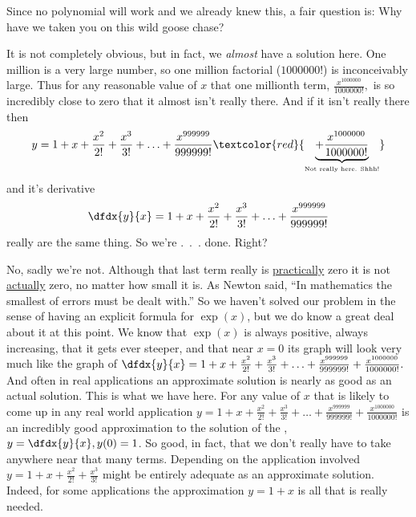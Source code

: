 Since no polynomial will work and we already knew this, a fair
question is: Why have we taken you on this wild goose chase?

It is not completely obvious, but in fact, we \emph{almost}
have a solution here. One million is a very large number, so one
million factorial ($1000000!$) is inconceivably large. Thus for any
reasonable value of $x$ that one millionth term,
$\frac{x^{1000000}}{1000000!},$ is so incredibly close to zero that it
almost isn't really there. And if it isn't really there then
$$
y= 1+x+\frac{x^2}{2!}+\frac{x^3}{3!} + \ldots +
\frac{x^{999999}}{999999!} 
\textcolor{red}{\underbrace{+
    \frac{x^{1000000}}{1000000!}}_{\text{\tiny Not really
      here. Shhh!}}}
$$
and it's derivative
$$
\dfdx{y}{x}= 1+x+\frac{x^2}{2!}+\frac{x^3}{3!} + \ldots +
\frac{x^{999999}}{999999!} 
$$
really are the same thing. So we're .\ .\ . done. Right?

No, sadly we're not. Although that last term really is
\underline{practically} zero it is not \underline{actually} zero, no matter
how small it is. As Newton said, ``In mathematics the smallest of
errors must be dealt with.'' So we haven't solved our
problem in the sense of having an explicit formula for $\exp(x)$, but
we do know a great deal about it at this point. We know that $\exp(x)$
is always positive, always increasing, that it gets ever steeper, and
that near $x=0$ its graph will look very much like the graph of $
\dfdx{y}{x}= 1+x+\frac{x^2}{2!}+\frac{x^3}{3!} + \ldots +
\frac{x^{999999}}{999999!} + \frac{x^{1000000}}{1000000!}.
$
And often in real
applications an approximate solution is nearly as good as an actual
solution. This is what we have here. For any value of $x$ that is
likely to come up in any real world application
$ y= 1+x+\frac{x^2}{2!}+\frac{x^3}{3!} + \ldots +
\frac{x^{999999}}{999999!} + \frac{x^{1000000}}{1000000!}$ is an
incredibly good approximation to the solution of the ,
$y=\dfdx{y}{x}, y(0)=1$.
So good, in fact, that we don't really have to take anywhere near
that many terms. Depending on the application involved
$y=1+x+\frac{x^2}{2!}+\frac{x^3}{3!}$ might be entirely adequate as
an approximate solution. Indeed, for some applications the
approximation $y=1+x$ is all that is really needed.

